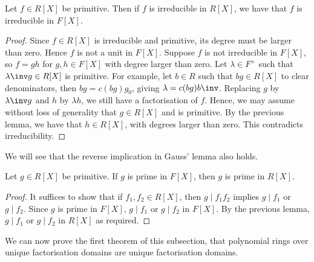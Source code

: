 \begin{lemma}
	Let $f \in R[X]$ be primitive.
	Then if $f$ is irreducible in $R[X]$, we have that $f$ is irreducible in $F[X]$.
\end{lemma}
\begin{proof}
	Since $f \in R[X]$ is irreducible and primitive, its degree must be larger than zero.
	Hence $f$ is not a unit in $F[X]$.
	Suppose $f$ is not irreducible in $F[X]$, so $f = gh$ for $g,h \in F[X]$ with degree larger than zero.
	Let $\lambda \in F^\times$ such that $\lambda\inv g \in R[X]$ is primitive.
	For example, let $b \in R$ such that $bg \in R[X]$ to clear denominators, then $bg = c(bg) g_0$, giving $\lambda = c(bg) b\inv$.
	Replacing $g$ by $\lambda\inv g$ and $h$ by $\lambda h$, we still have a factorisation of $f$.
	Hence, we may assume without loss of generality that $g \in R[X]$ and is primitive.
	By the previous lemma, we have that $h \in R[X]$, with degrees larger than zero.
	This contradicts irreducibility.
\end{proof}
\begin{remark}
	We will see that the reverse implication in Gauss' lemma also holds.
\end{remark}
\begin{lemma}
	Let $g \in R[X]$ be primitive.
	If $g$ is prime in $F[X]$, then $g$ is prime in $R[X]$.
\end{lemma}
\begin{proof}
	It suffices to show that if $f_1, f_2 \in R[X]$, then $g \mid f_1 f_2$ implies $g \mid f_1$ or $g \mid f_2$.
	Since $g$ is prime in $F[X]$, $g \mid f_1$ or $g \mid f_2$ in $F[X]$.
	By the previous lemma, $g \mid f_1$ or $g \mid f_2$ in $R[X]$ as required.
\end{proof}
We can now prove the first theorem of this subsection, that polynomial rings over unique factorisation domains are unique factorisation domains.
